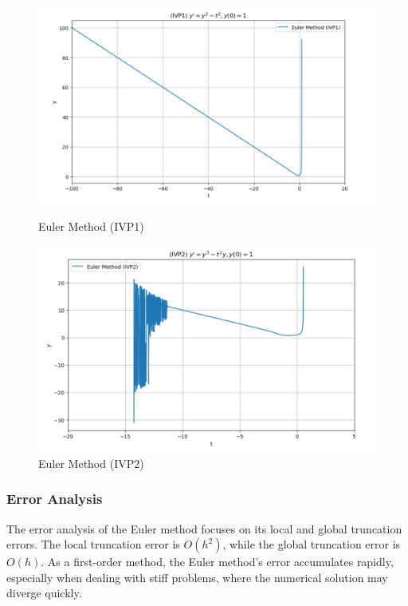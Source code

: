 \documentclass{article}
\begin{document}
\begin{figure}[htbp]
    \centering
    \begin{minipage}[b]{0.45\textwidth}
        \centering
        \includegraphics[width=\textwidth]{pic学长/欧拉方法-IVP1.png}
        \caption{Euler Method (IVP1)}
        \label{fig:image1}
    \end{minipage}
    \hspace{0.05\textwidth}
    \begin{minipage}[b]{0.45\textwidth}
        \centering
        \includegraphics[width=\textwidth]{pic学长/欧拉方法-IVP2.png}
        \caption{Euler Method (IVP2)}
        \label{fig:image2}
    \end{minipage}
\end{figure}

\subsubsection{Error Analysis}
The error analysis of the Euler method focuses on its local and global truncation errors. The local truncation error is \( O(h^2) \), while the global truncation error is \( O(h) \). As a first-order method, the Euler method's error accumulates rapidly, especially when dealing with stiff problems, where the numerical solution may diverge quickly.
\end{document}
